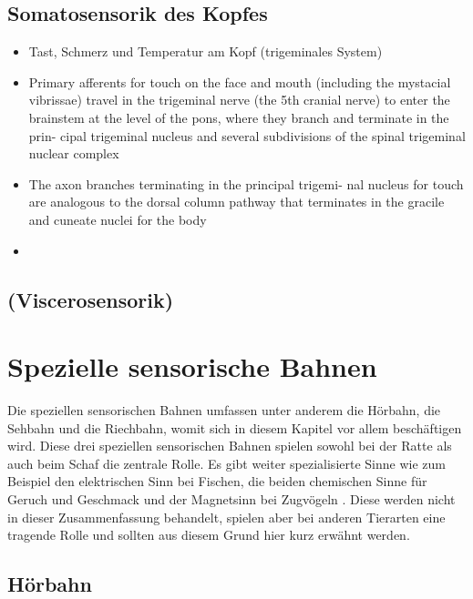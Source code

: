 \documentclass[12pt,a4paper,pdftex]{article}
\begin{document}
\subsection{Somatosensorik des Kopfes}
\begin{itemize}
    \item Tast, Schmerz und Temperatur am Kopf (trigeminales System)
    \item Primary
afferents for touch on the face and mouth (including the
mystacial vibrissae) travel in the trigeminal nerve (the 5th cranial nerve) to enter the brainstem at the level of
the pons, where they branch and terminate in the prin-
cipal trigeminal nucleus and several subdivisions of the
spinal trigeminal nuclear complex \cite{paxinos2014rat}
\item The axon branches terminating in the principal trigemi-
nal nucleus for touch are analogous to the dorsal column
pathway that terminates in the gracile and cuneate nuclei
for the body \cite{paxinos2014rat}
\item
\end{itemize}
\subsection{(Viscerosensorik)}

\newpage
\section{Spezielle sensorische Bahnen}
\label{sec:spezsens}
Die speziellen sensorischen Bahnen umfassen unter anderem die Hörbahn, die Sehbahn und die Riechbahn, womit sich in diesem Kapitel vor allem beschäftigen wird. Diese drei speziellen sensorischen Bahnen spielen sowohl bei der Ratte als auch beim Schaf die zentrale Rolle. Es gibt weiter spezialisierte Sinne wie zum Beispiel den elektrischen Sinn bei Fischen, die beiden chemischen Sinne für Geruch und Geschmack und der Magnetsinn bei Zugvögeln \cite{smith2008biology}. Diese werden nicht in dieser Zusammenfassung behandelt, spielen aber bei anderen Tierarten eine tragende Rolle und sollten aus diesem Grund hier kurz erwähnt werden.

\subsection{Hörbahn}
\end{document}
